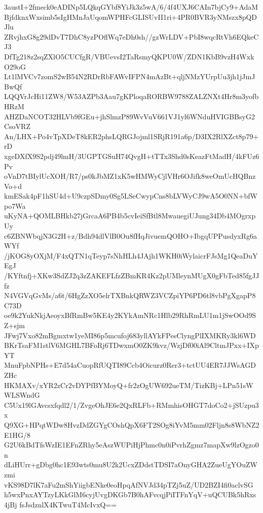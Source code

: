 3austI+2fmeck0eADINp5LQkqGYbf8YiJk3z5wA/6/4f4UXJ6CAIn7bjCy9+AdaM
BjfdknxWxsimb5sIgHMnJaUqomWPHFcGLISUvII1ri+4PR0BVR3yNMszx8pQDJlu
ZRvjhxG8g29dDvT7DhC8yzPOflWq7eDh0sh//gzWrLDV+PbI8wqcRtVh6EQkeCJ3
DfTg218z2sqZXlO5CUCfgR/VBUevsI2TaRsmyQKPU0W/ZDN1KbB9vzH4WxkO29oG
Lt1lMVCv7zomS2wB54N2RDrRbFAWvIFPN4mAzBt+qljNMzYUrpUu3jh1jJmJBwQf
LQQVrJcHi11ZW8/W53AZPb3Aau7gKPloqaRORBW9788ZALZNXt4Hr8m3yofbHRzM
AHZDaNCOT32HLVb9fGEu+jhSlmzP89WvVuV661VJ1yl6WNduHVIGBBsyG2CsoVRZ
An/LHX+Po4vTpXDeT8kER2phsLQRGJojml1SRjR191a6p/D3IX2RlXZct8p79+rD
xgeDXfX9S2pdj49lmH/3UGPTGSuH74QvgH+tTTx3Shd0sKeazFtMadH/4kFUz6Pv
oVnD7tBIylUcXOH/R7/ps0kJbMZ1xK5wHMWyCjlVHr6OJifk8weOmUcHQBnzVo+d
kmESak4pF1hSU4d+U9czpSDmy0Sg5LSeCwypCns8bLVWyCJ9wA5O0NN+bfWpo7Wa
uKyNA+QOMLBHkb27jGrcaA6PB4b5cvIeiSfBtl8MwauegiUJung34Db4MOgrxpUy
c6ZBNWbqjN3G2H+z/Bdh94dlVlB0Ou8fHqJivuemQOHO+IbgqUPPusdyxRg6aWYf
/jKOG8yOXjM/F4xQTN1qTeyp7sNhHLh4JAjh1WKH0iWylaicrFJsMg1QeaDuYEgJ
/KYftnfj+XKw3SdZJ2q3zZAKEFLfzZBmKR4Kz2pUMleynMUgX0gFbTed85fgJJfz
N4VGVqGvMs/a6t/6HgZzXO5elrTXBnkQRWZ3VCZpiYP6PD6tl8vbPgXgapP8C73D
oe9k2YukNkjAeoyxBfRmBw5KE4y2KYkAmNRc1Hlb29RhRmLU1m1jSwOOd9SZ+sjm
JFwj7Vxo82mBgmxtw1yeMI86p5mcufoj683yllAYkFPesClyngPlIXMKRy3kl6WD
BKrTsaFM1stlV6MGHL7BFoRj6TDwxmO0ZK9kvz/WzjDf00iAl9CltmJPxx+IXpYT
MnuFpbNPHs+E7d54aCuopRfUQTI89Ccb4Oicurz0Rer3+tctUU4ER7JJWsAGDZHc
HKMAXv/xYR2zCr2vDYPfBYMoyQ+fr2zOgUW692ueTM/TizKBj+LPn51sWWLSWndG
C5Ux19lGAvcsxfqdl2/1/ZvgeOhJE6e2QxRLFb+RMmhisOHGT7doCo2+jSUzpu3x
Q9XG+HPqtWDw8HvzDdZGYgCOshQpX6FT2SOg8iYvM5mm02Fljn8s8WbNZ2E1HG/8
G2U6kBdTfsWzIE1EFnZRhy5eAszWUPiHjPhmc0n0iPvrhZgmz7mapXw9lzOgzo0n
dLiHUrr+gDbg0hc1E93wts0mu8U2k2UcxZDdstTDSI7aOnyGHA2ZueUgYOuZWzmi
vKS98D7lK7aFu2mShYiigbENke0eoHpqAfNVJd34pTZj5uZ/UD2BZI4fi0aclvSG
h5wxPnxAYTzyLKkGlM6cyjUvgDKGb7B0hAFvcqjPiITFnYqV+uQCUBk5hRxs4jBj
fsJsdznlX4KTwuT4McIvxQ==
